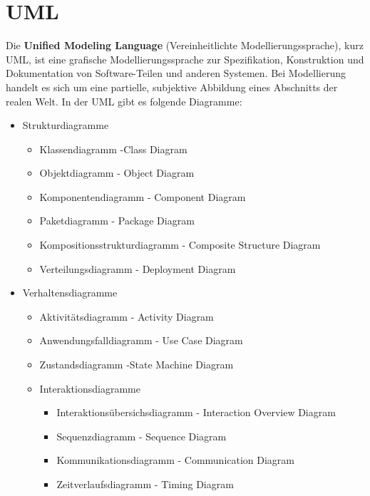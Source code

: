 \documentclass[a4paper,10pt,DIV9, BCOR12mm, oneside,openright,openbib]{scrreprt}
\theoremstyle{definition}
\theoremstyle{plain}
\begin{document}
\section{UML}


Die \textbf{Unified Modeling Language} (Vereinheitlichte Modellierungssprache), kurz UML, ist eine grafische Modellierungssprache zur Spezifikation, Konstruktion und Dokumentation von Software-Teilen und anderen Systemen. Bei Modellierung handelt es sich um eine partielle, subjektive Abbildung eines Abschnitts der realen Welt. \cite{Kluth2011}
In der UML gibt es folgende Diagramme:
\begin{itemize}
\item Strukturdiagramme
\begin{itemize}
  \item Klassendiagramm -Class Diagram
  \item Objektdiagramm - Object Diagram
  \item Komponentendiagramm - Component Diagram
  \item Paketdiagramm - Package Diagram
  \item Kompositionsstrukturdiagramm - Composite Structure Diagram
  \item Verteilungsdiagramm - Deployment Diagram
\end{itemize}
  \item Verhaltensdiagramme
\begin{itemize}
  \item Aktivitätsdiagramm - Activity Diagram
  \item Anwendungsfalldiagramm - Use Case Diagram 
  \item Zustandsdiagramm -State Machine Diagram
  \item Interaktionsdiagramme
  \begin{itemize}
  \item Interaktionsübersichsdiagramm - Interaction Overview Diagram
  \item Sequenzdiagramm - Sequence Diagram
  \item Kommunikationsdiagramm - Communication Diagram
  \item Zeitverlaufsdiagramm - Timing Diagram
  \end{itemize}
\end{itemize}
\end{itemize}
\end{document}
